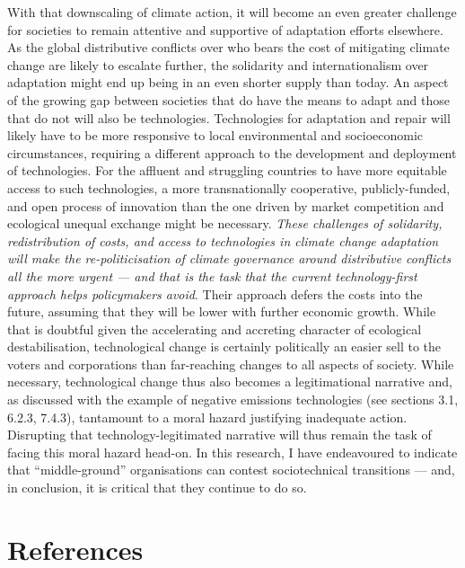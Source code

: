 \documentclass[a4paper, nobind]{templates/ociamthesis}
\begin{document}
With that downscaling of climate action, it will become an even greater challenge for societies to remain attentive and supportive of adaptation efforts elsewhere. As the global distributive conflicts over who bears the cost of mitigating climate change are likely to escalate further, the solidarity and internationalism over adaptation might end up being in an even shorter supply than today. An aspect of the growing gap between societies that do have the means to adapt and those that do not will also be technologies. Technologies for adaptation and repair will likely have to be more responsive to local environmental and socioeconomic circumstances, requiring a different approach to the development and deployment of technologies. For the affluent and struggling countries to have more equitable access to such technologies, a more transnationally cooperative, publicly-funded, and open process of innovation than the one driven by market competition and ecological unequal exchange might be necessary. \emph{These challenges of solidarity, redistribution of costs, and access to technologies in climate change adaptation will make the re-politicisation of climate governance around distributive conflicts all the more urgent --- and that is the task that the current technology-first approach helps policymakers avoid}. Their approach defers the costs into the future, assuming that they will be lower with further economic growth. While that is doubtful given the accelerating and accreting character of ecological destabilisation, technological change is certainly politically an easier sell to the voters and corporations than far-reaching changes to all aspects of society. While necessary, technological change thus also becomes a legitimational narrative and, as discussed with the example of negative emissions technologies (see sections 3.1, 6.2.3, 7.4.3), tantamount to a moral hazard justifying inadequate action. Disrupting that technology-legitimated narrative will thus remain the task of facing this moral hazard head-on. In this research, I have endeavoured to indicate that ``middle-ground'' organisations can contest sociotechnical transitions --- and, in conclusion, it is critical that they continue to do so.

\hypertarget{references}{%
\chapter*{References}\label{references}}

\end{document}
